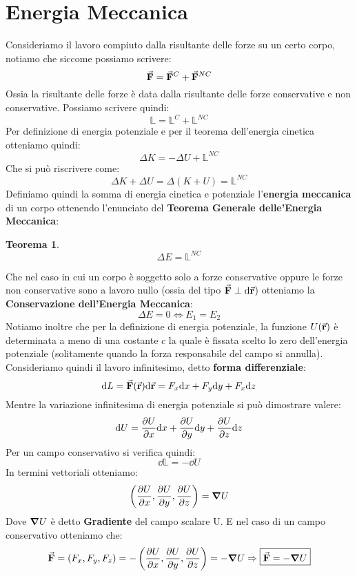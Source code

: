 \documentclass{article}
\newtheorem{thm}{Teorema}[section]
\newcommand{\then}{\ensuremath{\Rightarrow}}
\renewcommand{\r}{\va{r}}
\newcommand{\F}{\va{F}}
\begin{document}
\section{Energia Meccanica}
Consideriamo il lavoro compiuto dalla risultante delle forze su un certo corpo, notiamo che siccome possiamo scrivere:
\[\F=\F^C+\F^{NC}\]
Ossia la risultante delle forze è data dalla risultante delle forze conservative e non conservative. Possiamo scrivere quindi:
\[\mathbb{L}=\mathbb{L}^C+\mathbb{L}^{NC}\]
Per definizione di energia potenziale e per il teorema dell'energia cinetica otteniamo quindi:
\[\Delta K=-\Delta U+\mathbb{L}^{NC}\]
Che si può riscrivere come:
\[\Delta K+\Delta U=\Delta(K+U)=\mathbb{L}^{NC}\]
Definiamo quindi la somma di energia cinetica e potenziale l'\textbf{energia meccanica} di un corpo ottenendo l'enunciato del \textbf{Teorema Generale delle'Energia Meccanica}:
\begin{thm}
\begin{equation}
    \boxed{\Delta E=\mathbb{L}^{NC}}
\end{equation}
\end{thm}
Che nel caso in cui un corpo è soggetto solo a forze conservative oppure le forze non conservative sono a lavoro nullo (ossia del tipo $\F\perp\dd\r$) otteniamo la \textbf{Conservazione dell'Energia Meccanica}:
\begin{equation}
    \Delta E=0\iff E_1=E_2
\end{equation}
Notiamo inoltre che per la definizione di energia potenziale, la funzione $U(\r)$ è determinata a meno di una costante $c$ la quale è fissata scelto lo zero dell'energia potenziale (solitamente quando la forza responsabile del campo si annulla). 
Consideriamo quindi il lavoro infinitesimo, detto \textbf{forma differenziale}:
\[\dd L=\F(\r)\dd\r=F_x\dd x+F_y\dd y+F_x\dd z\]
Mentre la variazione infinitesima di energia potenziale si può dimostrare valere:
\[\dd U=\pdv{U}{x}\dd x+\pdv{U}{y}\dd y+\pdv{U}{z}\dd z\]
Per un campo conservativo si verifica quindi:
\[\dd \mathbb{L}=-\dd U\]
In termini vettoriali otteniamo:
\[\left(\pdv{U}{x},\pdv{U}{y},\pdv{U}{z}\right)=\grad{U}\]
Dove $\grad{U}$ è detto \textbf{Gradiente} del campo scalare U. E nel caso di un campo conservativo otteniamo che:
\[\F=\left(F_x,F_y,F_z\right)=-\left(\pdv{U}{x},\pdv{U}{y},\pdv{U}{z}\right)=-\grad{U}\then\boxed{ \F=-\grad{U}}\]
\end{document}
